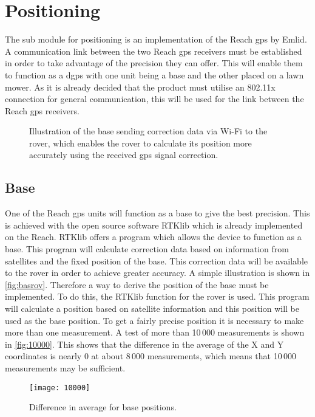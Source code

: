 \section{Positioning}
The sub module for positioning is an implementation of the Reach \gls{gps} by Emlid. A communication link between the two Reach \gls{gps} receivers must be established in order to take advantage of the precision they can offer. This will enable them to function as a \gls{dgps} with one unit being a base and the other placed on a lawn mower. As it is already decided that the product must utilise an 802.11x connection for general communication, this will be used for the link between the Reach \gls{gps} receivers.

\begin{figure}[h]%
\centering%
\setlength{\unitlength}{1mm}%
%
\caption{Illustration of the base sending correction data via Wi-Fi to the rover, which enables the rover to calculate its position more accurately using the received \gls{gps} signal correction.}%
\label{fig:basrov}%
\end{figure}

\subsection{Base}

One of the Reach \gls{gps} units will function as a base to give the best precision. This is achieved with the open source software RTKlib which is already implemented on the Reach. RTKlib offers a program which allows the device to function as a base. This program will calculate correction data based on information from satellites and the fixed position of the base. This correction data will be available to the rover in order to achieve greater accuracy. A simple illustration is shown in \autoref{fig:basrov}. Therefore a way to derive the position of the base must be implemented. To do this, the RTKlib function for the rover is used. This program will calculate a position based on satellite information and this position will be used as the base position. To get a fairly precise position it is necessary to make more than one measurement. A test of more than 10\,000 measurements is shown in \autoref{fig:10000}. This shows that the difference in the average of the X and Y coordinates is nearly 0 at about 8\,000 measurements, which means that 10\,000 measurements may be sufficient. 
\begin{figure}[htb]
\texttt{[image: 10000]}
\caption{Difference in average for base positions.}
\label{fig:10000}
\end{figure}

